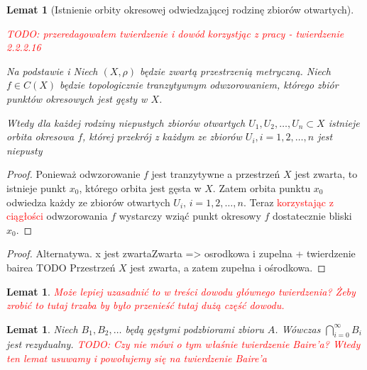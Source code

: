 \documentclass[licencjacka]{pwr_wmat_praca_dyplomowa}
\theoremstyle{plain}
\numberwithin{theorem}{chapter}
\newtheorem{lemma}[theorem]{Lemat}
\theoremstyle{definition}
\numberwithin{theorem}{chapter}
\begin{document}
\begin{lemma}[Istnienie orbity okresowej odwiedzającej rodzinę zbiorów otwartych]
\label{lemat_3_glownego_artykulu_istnieje_orbita_okresowa_krojaca_sie_z_rodzina_otwartych}

\textcolor{red}{TODO: przeredagowałem twierdzenie i dowód korzystjąc z pracy \cite[s.~7]{someAspectsOfTopologicalTransitivity} - twierdzenie 2.2.2.16}

Na podstawie \cite[s.~231-232 Lemma 3]{balibrea2003topological} i \cite[s.~7]{someAspectsOfTopologicalTransitivity}
Niech $(X, \rho)$ będzie zwartą przestrzenią metryczną.
Niech $f \in C(X)$ będzie topologicznie tranzytywnym odwzorowaniem, którego zbiór punktów okresowych jest gęsty w $X$. 

Wtedy dla każdej rodziny niepustych zbiorów otwartych $U_1, U_2, \ldots, U_n \subset X$ istnieje orbita okresowa $f$, której przekrój z każdym ze zbiorów $U_i, i=1,2,\ldots,n$ jest niepusty
\end{lemma}

\begin{proof}
Ponieważ odwzorowanie $f$ jest tranzytywne a przestrzeń $X$ jest zwarta, to istnieje punkt $x_0$, którego orbita jest gęsta w $X$. Zatem orbita punktu $x_0$ odwiedza każdy ze zbiorów otwartych $U_i, \, i = 1,2,\ldots,n.$ Teraz \textcolor{red}{korzystając z ciągłości} odwzorowania $f$ wystarczy wziąć punkt okresowy $f$ dostatecznie bliski $x_0.$
\end{proof}

\begin{proof}
Alternatywa.
x jest zwartaZwarta => osrodkowa i zupelna + twierdzenie bairea
TODO
Przestrzeń $X$ jest zwarta, a zatem zupełna i ośrodkowa.
\end{proof}


\begin{lemma}
\label{wszystkie_wloknowe_na_implikuje_punkt_okresowy}
\textcolor{red}{Może lepiej uzasadnić to w treści dowodu głównego twierdzenia? Żeby zrobić to tutaj trzaba by było przenieść tutaj dużą część dowodu.}
\end{lemma}



\begin{lemma}
\label{przeliczalny_przekroj_gestych_jest_rezydualny} 
Niech $B_1, B_2, \ldots $ będą gęstymi podzbiorami zbioru $A$. Wówczas $\bigcap_{i=0}^{\infty} B_i$ jest rezydualny.
\textcolor{red}{TODO: Czy nie mówi o tym właśnie twierdzenie Baire'a? Wtedy ten lemat usuwamy i powołujemy się na twierdzenie Baire'a}
\end{lemma}
\end{document}
